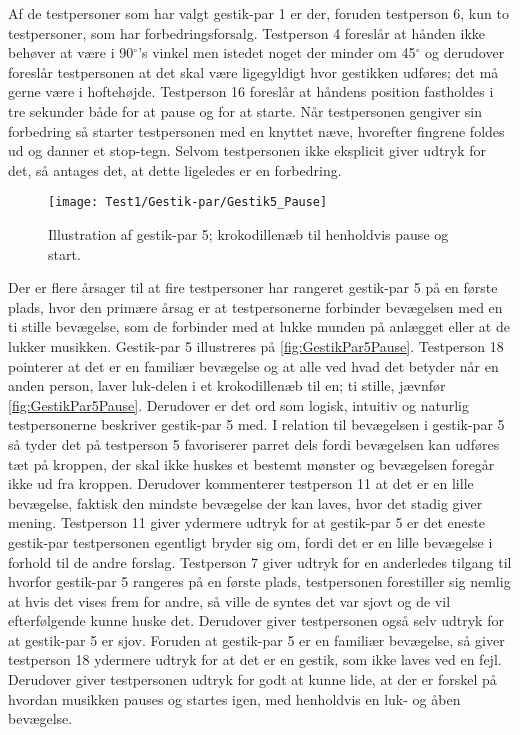 Af de testpersoner som har valgt gestik-par 1 er der, foruden testperson 6, kun to testpersoner, som har forbedringsforsalg. Testperson 4 foreslår at hånden ikke behøver at være i 90$^{\circ}$'s vinkel men istedet noget der minder om 45$^{\circ}$ og derudover foreslår testpersonen at det skal være ligegyldigt hvor gestikken udføres; det må gerne være i hoftehøjde. Testperson 16 foreslår at håndens position fastholdes i tre sekunder både for at pause og for at starte. Når testpersonen gengiver sin forbedring så starter testpersonen med en knyttet næve, hvorefter fingrene foldes ud og danner et stop-tegn. Selvom testpersonen ikke eksplicit giver udtryk for det, så antages det, at dette ligeledes er en forbedring.
%
\begin{figure}[H]
	\centering
	\texttt{[image: Test1/Gestik-par/Gestik5\_Pause]}
	\caption{Illustration af gestik-par 5; krokodillenæb til henholdvis pause og start.}
	\label{fig:GestikPar5Pause}
\end{figure}
\noindent
%
Der er flere årsager til at fire testpersoner har rangeret gestik-par 5 på en første plads, hvor den primære årsag er at testpersonerne forbinder bevægelsen med en ti stille bevægelse, som de forbinder med at lukke munden på anlægget eller at de lukker musikken. Gestik-par 5 illustreres på \autoref{fig:GestikPar5Pause}. Testperson 18 pointerer at det er en familiær bevægelse og at alle ved hvad det betyder når en anden person, laver luk-delen i et krokodillenæb til en; ti stille, jævnfør \autoref{fig:GestikPar5Pause}. Derudover er det ord som logisk, intuitiv og naturlig testpersonerne beskriver gestik-par 5 med. I relation til bevægelsen i gestik-par 5 så tyder det på testperson 5 favoriserer parret dels fordi bevægelsen kan udføres tæt på kroppen, der skal ikke huskes et bestemt mønster og bevægelsen foregår ikke ud fra kroppen. Derudover kommenterer testperson 11 at det er en lille bevægelse, faktisk den mindste bevægelse der kan laves, hvor det stadig giver mening. Testperson 11 giver ydermere udtryk for at gestik-par 5 er det eneste gestik-par testpersonen egentligt bryder sig om, fordi det er en lille bevægelse i forhold til de andre forslag. Testperson 7 giver udtryk for en anderledes tilgang til hvorfor gestik-par 5 rangeres på en første plads, testpersonen forestiller sig nemlig at hvis det vises frem for andre, så ville de syntes det var sjovt og de vil efterfølgende kunne huske det. Derudover giver testpersonen også selv udtryk for at gestik-par 5 er sjov. Foruden at gestik-par 5 er en familiær bevægelse, så giver testperson 18 ydermere udtryk for at det er en gestik, som ikke laves ved en fejl. Derudover giver testpersonen udtryk for godt at kunne lide, at der er forskel på hvordan musikken pauses og startes igen, med henholdvis en luk- og åben bevægelse. 

